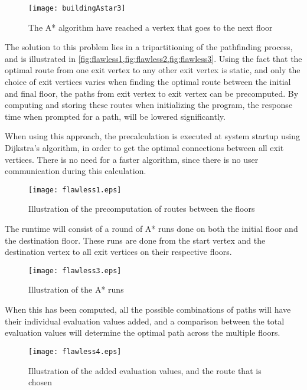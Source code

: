 \begin{figure}[ht!]
\raggedright
  \texttt{[image: buildingAstar3]}
  \caption{The A* algorithm have reached a vertex that goes to the next floor}
  \label{fig:buildingAstar3}
\end{figure}


The solution to this problem lies in a tripartitioning of the pathfinding process, and is illustrated in \cref{fig:flawless1,fig:flawless2,fig:flawless3}. Using the fact that the optimal route from one exit vertex to any other exit vertex is static, and only the choice of exit vertices varies when finding the optimal route between the initial and final floor, the paths from exit vertex to exit vertex can be precomputed. By computing and storing these routes when initializing the program, the response time when prompted for a path, will be lowered significantly.

When using this approach, the precalculation is executed at system startup using Dijkstra's algorithm, in order to get the optimal connections between all exit vertices. There is no need for a faster algorithm, since there is no user communication during this calculation.

%

\begin{figure}[ht!]
    \centering
    \texttt{[image: flawless1.eps]}
    \caption{Illustration of the precomputation of routes between the floors}
    \label{fig:flawless1}
  \end{figure}

The runtime will consist of a round of A* runs done on both the initial floor and the destination floor. These runs are done from the start vertex and the destination vertex to all exit vertices on their respective floors. 

\begin{figure}[ht!]
    \centering
    \texttt{[image: flawless3.eps]}
    \caption{Illustration of the A* runs}
    \label{fig:flawless2}
  \end{figure}

When this has been computed, all the possible combinations of paths will have their individual evaluation values added, and a comparison between the total evaluation values will determine the optimal path across the multiple floors. 

\begin{figure}[ht!]
    \centering
    \texttt{[image: flawless4.eps]}
    \caption{Illustration of the added evaluation values, and the route that is chosen}
    \label{fig:flawless3}
  \end{figure}

